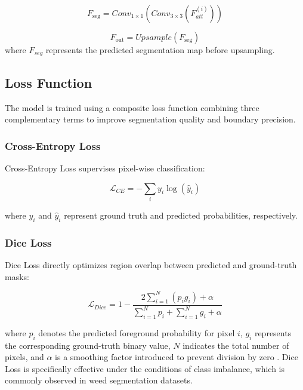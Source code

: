 \documentclass[pdflatex,sn-mathphys-num]{sn-jnl}
\begin{document}
\begin{equation}
F_{\text{seg}} = Conv_{1\times1}(Conv_{3\times3}(F_{att}^{(i)}))\label{eq10}
\end{equation}

\begin{equation}
F_{\text{out}} = Upsample(F_{\text{seg}})\label{eq11}
\end{equation}
where $F_{seg}$ represents the predicted segmentation map before upsampling.
\subsection{Loss Function}

The model is trained using a composite loss function combining three complementary terms to improve segmentation quality and boundary precision.

\subsubsection{Cross-Entropy Loss}

Cross-Entropy Loss supervises pixel-wise classification:

\begin{equation}
\mathcal{L}_{CE} = - \sum_{i} y_i \log(\hat{y}_i)
\end{equation}

where $y_i$ and $\hat{y}_i$ represent ground truth and predicted probabilities, respectively.

\subsubsection{Dice Loss}

Dice Loss directly optimizes region overlap between predicted and ground-truth masks:

\begin{equation}
\mathcal{L}_{Dice} = 1 - \frac{2 \sum_{i=1}^{N} (p_i g_i) + \alpha}
{\sum_{i=1}^{N} p_i + \sum_{i=1}^{N} g_i + \alpha}
\end{equation}

where $p_i$ denotes the predicted foreground probability for pixel $i$, $g_i$ represents the corresponding ground-truth binary value, $N$ indicates the total number of pixels, and $\alpha$ is a smoothing factor introduced to prevent division by zero \cite{milletari2016vnet}.
Dice Loss is specifically effective under the conditions of class imbalance, which is commonly observed in weed segmentation datasets.
\end{document}

